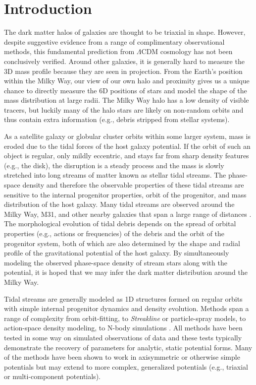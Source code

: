 \documentclass[letterpaper,12pt,preprint]{aastex}
\begin{document}
\keywords{
}

\section{Introduction}\label{sec:introduction}

The dark matter halos of galaxies are thought to be triaxial in shape. However, despite suggestive evidence from a range of complimentary observational methods, this fundamental prediction from $\Lambda$CDM cosmology has not been conclusively verified. Around other galaxies, it is generally hard to measure the 3D mass profile because they are seen in projection. From the Earth's position within the Milky Way, our view of our own halo and proximity gives us a unique chance to directly measure the 6D positions of stars and model the shape of the mass distribution at large radii. The Milky Way halo has a low density of visible tracers, but luckily many of the halo stars are likely on non-random orbits and thus contain extra information (e.g., debris stripped from stellar systems).

As a satellite galaxy or globular cluster orbits within some larger system, mass is eroded due to the tidal forces of the host galaxy potential. If the orbit of such an object is regular, only mildly eccentric, and stays far from sharp density features (e.g., the disk), the disruption is a steady process and the mass is slowly stretched into long streams of matter known as stellar tidal streams. The phase-space density and therefore the observable properties of these tidal streams are sensitive to the internal progenitor properties, orbit of the progenitor, and mass distribution of the host galaxy. Many tidal streams are observed around the Milky Way, M31, and other nearby galaxies that span a large range of distances \citep[$\approx$10--100~kpc][]{cite many}. The morphological evolution of tidal debris depends on the spread of orbital properties (e.g., actions or frequencies) of the debris and the orbit of the progenitor system, both of which are also determined by the shape and radial profile of the gravitational potential of the host galaxy. By simultaneously modeling the observed phase-space density of stream stars along with the potential, it is hoped that we may infer the dark matter distribution around the Milky Way.

Tidal streams are generally modeled as 1D structures formed on regular orbits with simple internal progenitor dynamics and density evolution. Methods span a range of complexity from orbit-fitting, to \emph{Streakline} or particle-spray models, to action-space density modeling, to N-body simulations \citep[see, e.g., the introduction of][]{kuepper15}. All methods have been tested in some way on simulated observations of data and these tests typically demonstrate the recovery of parameters for analytic, static potential forms. Many of the methods have been shown to work in axisymmetric or otherwise simple potentials but may extend to more complex, generalized potentials (e.g., triaxial or multi-component potentials). 
\end{document}
